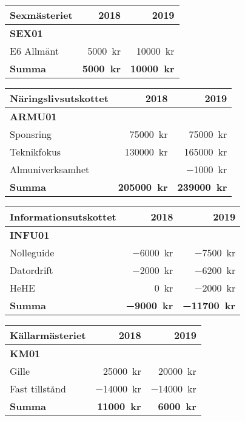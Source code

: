 \documentclass[10pt]{article}
\begin{document}
    \begin{tabularx}{10cm}{X r r}
        \textbf{\large Sexmästeriet} & \textbf{2018} & \textbf{2019} \\
        \hline
        \textbf{SEX01} \\
        E6 Allmänt & \SI{5000}{kr} & \SI{10000}{kr} \\
        \hline
        \textbf{Summa} & \textbf{\SI{5000}{kr}} & \textbf{\SI{10000}{kr}} \\
    \end{tabularx}
    
    \begin{tabularx}{10cm}{X r r}
        \textbf{\large Näringslivsutskottet} & \textbf{2018} & \textbf{2019} \\
        \hline
        \textbf{ARMU01} \\
        Sponsring & \SI{75000}{kr} & \SI{75000}{kr} \\
        Teknikfokus & \SI{130000}{kr} & \SI{165000}{kr} \\
        Almuniverksamhet &  & \SI{-1000}{kr} \\
        \hline
        \textbf{Summa} & \textbf{\SI{205000}{kr}} & \textbf{\SI{239000}{kr}} \\
    \end{tabularx}
    
    \begin{tabularx}{10cm}{X r r}
        \textbf{\large Informationsutskottet} & \textbf{2018} & \textbf{2019} \\
        \hline
        \textbf{INFU01} \\
        Nolleguide & \SI{-6000}{kr} & \SI{-7500}{kr} \\
        Datordrift & \SI{-2000}{kr} & \SI{-6200}{kr} \\
        HeHE & \SI{0}{kr} & \SI{-2000}{kr} \\
        \hline
        \textbf{Summa} & \textbf{\SI{-9000}{kr}} & \textbf{\SI{-11700}{kr}} \\
    \end{tabularx}
    
    \begin{tabularx}{10cm}{X r r}
        \textbf{\large Källarmästeriet} & \textbf{2018} & \textbf{2019} \\
        \hline
        \textbf{KM01} \\
        Gille & \SI{25000}{kr} & \SI{20000}{kr} \\
        Fast tillstånd & \SI{-14000}{kr} & \SI{-14000}{kr} \\
        \hline
        \textbf{Summa} & \textbf{\SI{11000}{kr}} & \textbf{\SI{6000}{kr}} \\
    \end{tabularx}
    
\end{document}
